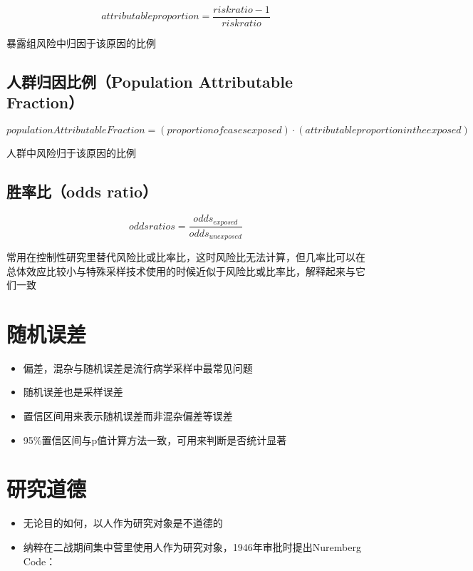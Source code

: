 \documentclass[]{book}
\providecommand{\tightlist}{%
  \setlength{\itemsep}{0pt}\setlength{\parskip}{0pt}}
\begin{document}
\[attributable proportion = \frac{risk ratio - 1}{risk ratio}\]

暴露组风险中归因于该原因的比例

\hypertarget{ux4ebaux7fa4ux5f52ux56e0ux6bd4ux4f8bpopulation-attributable-fraction}{%
\subsection{人群归因比例（Population Attributable Fraction）}\label{ux4ebaux7fa4ux5f52ux56e0ux6bd4ux4f8bpopulation-attributable-fraction}}

\[population Attributable Fraction = (proportion of cases exposed) \cdot (attributable proportion in the exposed)\]

人群中风险归于该原因的比例

\hypertarget{ux80dcux7387ux6bd4odds-ratio}{%
\subsection{胜率比（odds ratio）}\label{ux80dcux7387ux6bd4odds-ratio}}

\[odds ratios = \frac{odds_{exposed}}{odds_{unexposed}}\]

常用在控制性研究里替代风险比或比率比，这时风险比无法计算，但几率比可以在总体效应比较小与特殊采样技术使用的时候近似于风险比或比率比，解释起来与它们一致

\hypertarget{ux968fux673aux8befux5dee}{%
\section{随机误差}\label{ux968fux673aux8befux5dee}}

\begin{itemize}
\tightlist
\item
  偏差，混杂与随机误差是流行病学采样中最常见问题
\item
  随机误差也是采样误差
\item
  置信区间用来表示随机误差而非混杂偏差等误差
\item
  95\%置信区间与p值计算方法一致，可用来判断是否统计显著
\end{itemize}

\hypertarget{ux7814ux7a76ux9053ux5fb7}{%
\section{研究道德}\label{ux7814ux7a76ux9053ux5fb7}}

\begin{itemize}
\tightlist
\item
  无论目的如何，以人作为研究对象是不道德的
\item
  纳粹在二战期间集中营里使用人作为研究对象，1946年审批时提出Nuremberg Code：
\end{itemize}
\end{document}

